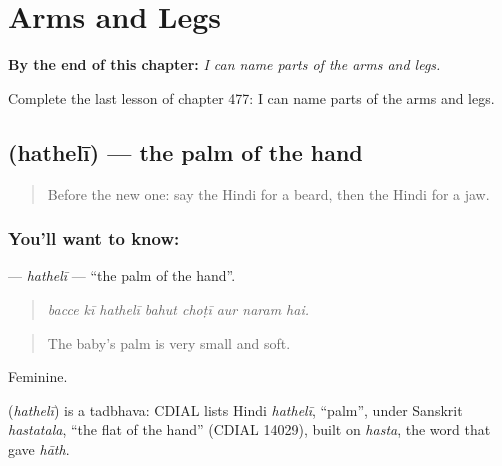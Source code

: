 
\chapter{Arms and Legs}
\label{ch:hi-arms-and-legs}

\begin{chapteropening}
\textbf{By the end of this chapter:} \emph{I can name parts of the arms and legs.}

Complete the last lesson of chapter 477: I can name parts of the arms and legs.
\end{chapteropening}

\section[\texorpdfstring{\hi{हथेली} (hathelī)}{हथेली (hathelī)}]{ (hathelī) — the palm of the hand}

\label{lesson:HI-C477-hatheli}



\begin{quote}
Before the new one: say the Hindi for a beard, then the Hindi for a jaw.
\end{quote}

\subsection*{You'll want to know: }
\textbf{} — \emph{hathelī} — \textquotedblleft{}the palm of the hand\textquotedblright{}.

\begin{quote}
       
\end{quote}

\begin{quote}
\emph{bacce kī hathelī bahut choṭī aur naram hai.}
\end{quote}

\begin{quote}
The baby's palm is very small and soft.
\end{quote}

Feminine.

\begin{cousinweb}
\textbf{} (\emph{hathelī}) is a tadbhava: CDIAL lists Hindi \emph{hathelī}, \textquotedblleft{}palm\textquotedblright{}, under Sanskrit \emph{hastatala}, \textquotedblleft{}the flat of the hand\textquotedblright{} (CDIAL 14029), built on \emph{hasta}, the word that gave \emph{hāth}.
\end{cousinweb}

